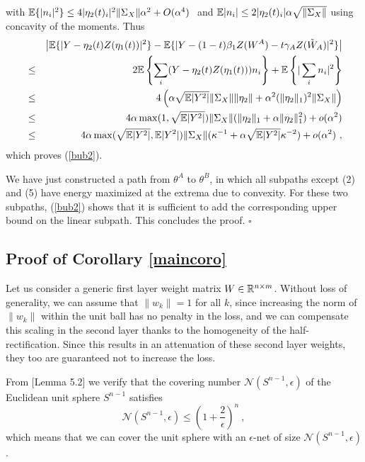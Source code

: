 with ${\mathbb{E}}\{ |n_i |^2 \} \leq 4 |\eta_2(t)_i|^2 \| \Sigma_X \| \alpha^2 + O(\alpha^4)~$ and ${\mathbb{E}} |n_i| \leq 2 |\eta_2(t)_i| \alpha \sqrt{\| \Sigma_X\|}$ using concavity of the moments.
Thus 
\begin{eqnarray*}
&& \left | {\mathbb{E}} \{ | Y - \eta_2(t) Z(\eta_1(t) ) |^2 \}  - {\mathbb{E}} \{ | Y - (1-t) \beta_1 Z(W^A) - t \gamma_A Z(\tilde{W}_A) |^2 \} \right| \\
 &\leq& 2{\mathbb{E}} \left\{  \sum_i (Y - \eta_2(t) Z(\eta_1(t) )) n_i  \right\} + {\mathbb{E}} \left\{ | \sum_i n_i |^2 \right\} \\
 &\leq & 4\left(\alpha \sqrt{{\mathbb{E}}|Y^2|} \| \Sigma_X\|  \| \eta_2 \| + \alpha^2 (\| \eta_2 \|_1)^2  \| \Sigma_X \| \right) \\
 &\leq & 4 \alpha \max(1, \sqrt{{\mathbb{E}}|Y^2|}) \| \Sigma_X \| ( \| \eta_2 \|_1 + \alpha \| \eta_2 \|_1^2) + o(\alpha^2) \\
 & \leq & 4 \alpha \max(\sqrt{{\mathbb{E}}|Y^2|}, {{\mathbb{E}}|Y^2|}) \| \Sigma_X \|  ( \kappa^{-1} + \alpha \sqrt{{\mathbb{E}}|Y^2|} \kappa^{-2}) + o(\alpha^2)~,
\end{eqnarray*}
 which proves (\ref{bub2}). 
 
We have just constructed a path from $\theta^A$ to $\theta^B$, in which all subpaths except (2) and (5) have energy maximized at the extrema due to convexity. For these two subpaths, (\ref{bub2}) shows that it is sufficient to add the corresponding upper bound on the linear subpath. This concludes the proof. $\square$
 




\subsection{Proof of Corollary \ref{maincoro}}

Let us consider a generic first layer weight matrix $W \in {\mathbb{R}}^{n \times m}$. Without loss of generality, we can assume that $\| w_k \|=1$ for all $k$, since increasing the norm of $\|w_k\|$ 
within the unit ball has no penalty in the loss, and we can compensate this scaling in the second layer
thanks to the homogeneity of the half-rectification. Since this results in an attenuation of these second layer weights, 
they too are guaranteed not to increase the loss. 

From \cite{vershynin} [Lemma 5.2] we verify that the covering number $\mathcal{N}(S^{n-1}, \epsilon)$ of the Euclidean unit sphere $S^{n-1}$ 
satisfies 
$$\mathcal{N}(S^{n-1}, \epsilon) \leq \left( 1 + \frac{2}{\epsilon} \right)^n~,$$
which means that we can cover the unit sphere with an $\epsilon$-net of size $\mathcal{N}(S^{n-1}, \epsilon) $. 

